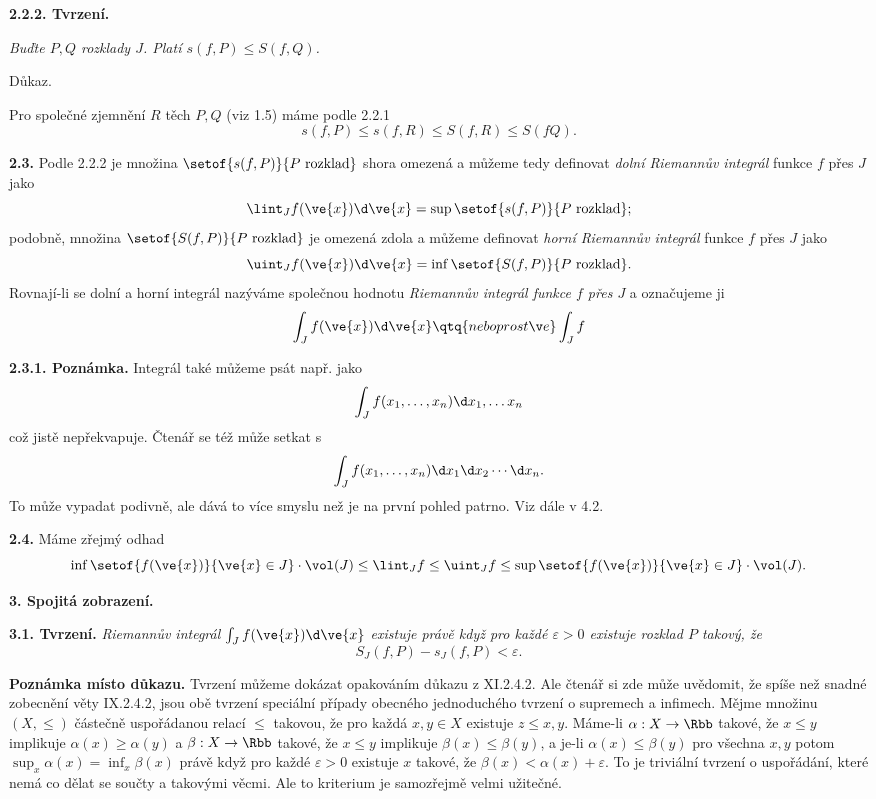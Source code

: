 \documentclass[12pt]{article}
\begin{document}
\bigskip

{\bf 2.2.2. Tvrzení.} {\em Buďte $P,Q$ rozklady $J$. Platí $s(f,P)\leq S(f,Q)$.

Důkaz.} Pro společné zjemnění $R$ těch $P,Q$ (viz 1.5) máme podle 2.2.1
$$
s(f,P)\leq s(f,R)\leq S(f,R)\leq S(fQ).
$$\sq

\bigskip

{\bf 2.3.}  Podle  2.2.2 je množina  $\setof{s(f,P)}{P\ \text{rozklad}}$ shora omezená a můžeme tedy definovat {\em dolní Riemannův integrál} funkce $f$ přes $J$ jako
$$
\lint_Jf(\ve{x})\d\ve{x}=\sup\setof{s(f,P)}{P\ \text{rozklad}};
$$ 
podobně,
množina $\setof{S(f,P)}{P\ \text{rozklad}}$ je omezená zdola a můžeme definovat {\em horní Riemannův integrál}  funkce $f$ přes  $J$ jako
$$
\uint_Jf(\ve{x})\d\ve{x}=\inf\setof{S(f,P)}{P\ \text{rozklad}}.
$$ 
Rovnají-li se dolní a horní integrál nazýváme společnou hodnotu {\em  Riemannův integrál funkce $f$ přes $J$} a
označujeme ji
$$
\int_Jf(\ve{x})\d\ve{x} \qtq{nebo prostě} \int_Jf
$$

\medskip

{\bf 2.3.1. Poznámka.} Integrál také můžeme psát např.  jako
$$
\int_Jf(x_1,\dots,x_n)\d x_1,\dots x_n
$$
 což jistě nepřekvapuje. Čtenář se též může setkat s
$$
\int_Jf(x_1,\dots,x_n)\d x_1\d x_2\cdots\d x_n.
$$
To může vypadat podivně, ale dává to více smyslu než je na první pohled patrno. Viz dále v 4.2.

\bigskip

{\bf 2.4.} Máme zřejmý odhad
$$
\inf\setof{f(\ve{x})}{\ve{x}\in J}\cdot\vol(J)\leq\lint_Jf\leq\uint_Jf\leq\sup\setof{f(\ve{x})}{\ve{x}\in J}\cdot\vol(J).
$$


 
 \newpage
 
  
 {\large\bf 3. Spojitá zobrazení.}
 
 \bigskip
 
{\bf 3.1.
 Tvrzení.} {\em Riemannův integrál $\int_Jf(\ve{x})\d\ve{x}$ existuje právě když pro každé $\varepsilon >0$ existuje rozklad $P$ takový, že
  $$
  S_J(f,P)-s_J(f,P)<\varepsilon.
  $$
 }
 
\medskip

{\bf Poznámka místo důkazu.} Tvrzení můžeme dokázat opakováním důkazu z  XI.2.4.2. Ale čtenář si zde může uvědomit, že spíše než snadné zobecnění věty
 IX.2.4.2, jsou obě tvrzení  speciální případy obecného jednoduchého tvrzení o supremech a infimech.
Mějme množinu $(X,\leq)$ částečně uspořádanou relací $\leq$ takovou, že pro každá $x,y\in X$ existuje $z\leq x,y$. Máme-li $\alpha:X\to\Rbb$ takové, že $x\leq y$ implikuje $\alpha(x)\geq\alpha(y)$ a $\beta:X\to\Rbb$ takové, že $x\leq y$ implikuje $\beta(x)\leq\beta(y)$, a je-li $\alpha(x)\leq\beta(y)$ pro všechna  $x,y$ potom $\sup_x\alpha(x)=\inf_x\beta(x)$ právě když pro každé $\varepsilon>0$ existuje $x$ takové, že $\beta(x)<\alpha(x)+\varepsilon$. To je triviální tvrzení o  uspořádání, které nemá co dělat se součty a takovými věcmi.  Ale to kriterium je samozřejmě velmi užitečné.
\end{document}
